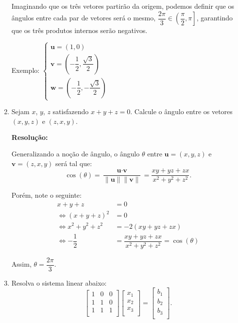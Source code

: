 \documentclass[leqno]{article}
\begin{document}
\begin{enumerate}
    Imaginando que os três vetores partirão da origem, podemos definir que os ângulos entre cada par de vetores será o mesmo, $\dfrac{2\pi}{3}\in\left(\dfrac{\pi}{2},\pi\right]$, garantindo que os três produtos internos serão negativos.
    
    Exemplo:
    $
    \begin{cases}
    \textbf{u}=(1,0)\\
    \textbf{v}=\left(-\dfrac{1}{2},\dfrac{\sqrt{3}}{2}\right)\\
    \textbf{w}=\left(-\dfrac{1}{2},-\dfrac{\sqrt{3}}{2}\right)
    \end{cases}
    $
    
    \item Sejam $x$, $y$, $z$ satisfazendo $x + y + z = 0$. Calcule o ângulo entre os vetores $(x, y, z)$ e $(z, x, y)$.
    
    \textbf{Resolução:}
    
    Generalizando a noção de ângulo, o ângulo $\theta$ entre $\textbf{u}=(x,y,z)$ e $\textbf{v}=(z,x,y)$ será tal que:
    $$\cos(\theta)=\dfrac{\textbf{u}\cdot\textbf{v}}{\lVert\textbf{u}\rVert\lVert\textbf{v}\rVert}=\dfrac{xy+yz+zx}{x^2+y^2+z^2}\text{.}$$
    
    Porém, note o seguinte:
    \begin{align*}
        x+y+z&=0\\
        \iff (x+y+z)^2&=0\\
        \iff x^2+y^2+z^2&=-2(xy+yz+zx)\\
        \iff -\dfrac{1}{2}&=\dfrac{xy+yz+zx}{x^2+y^2+z^2}=\cos(\theta)
    \end{align*}
    
    Assim, $\theta=\dfrac{2\pi}{3}$.
    
    \item Resolva o sistema linear abaixo:
    $$\begin{bmatrix}
    1 & 0 & 0\\
    1 & 1 & 0\\
    1 & 1 & 1\\
    \end{bmatrix}\begin{bmatrix}
    x_1\\
    x_2\\
    x_3\\
    \end{bmatrix}=\begin{bmatrix}
    b_1\\
    b_2\\
    b_3\\
    \end{bmatrix}\text{.}$$
    

\end{enumerate}
\end{document}
